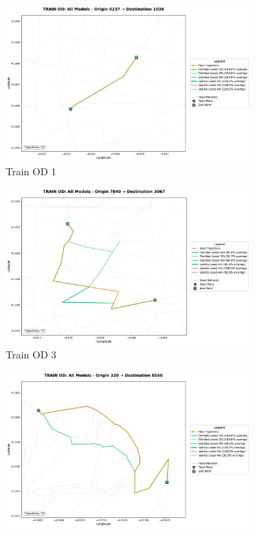 \begin{figure}[H]
    \centering
    \begin{subfigure}{0.49\linewidth}
        \centering
        \includegraphics[width=\linewidth]{assets/plots/eval/porto/cross_model/train/train_od_comparison_1_origin8237_dest1036.pdf}
        \caption{Train OD 1}
    \end{subfigure}
    \begin{subfigure}{0.49\linewidth}
        \centering
        \includegraphics[width=\linewidth]{assets/plots/eval/porto/cross_model/train/train_od_comparison_3_origin7840_dest3067.pdf}
        \caption{Train OD 3}
    \end{subfigure}
    \begin{subfigure}{0.49\linewidth}
        \centering
        \includegraphics[width=\linewidth]{assets/plots/eval/porto/cross_model/train/train_od_comparison_5_origin320_dest8550.pdf}

\end{subfigure}
\end{figure}
